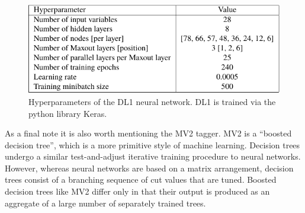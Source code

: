        
            \begin{figure}[tbh] \center
                \includegraphics[width=0.7\linewidth,height=\textheight,keepaspectratio]{tables/reconstruction/DL1_hyperparams}
                \caption{
                    Hyperparameters of the DL1 neural network\cite{bjet_id_and_performance}.
                    DL1 is trained via the python library Keras.
                }
                \label{tab:DL1_hyperparams}
            \end{figure}

            As a final note it is also worth mentioning the MV2 tagger.
            MV2 is a ``boosted decision tree'', which is a more primitive style of machine learning.
            Decision trees undergo a similar test-and-adjust iterative training procedure to neural networks.
            However, whereas neural networks are based on a matrix arrangement,
                decision trees consist of a branching sequence of cut values that are tuned.
            Boosted decision trees like MV2 differ only in that their output is produced as an aggregate of a large number of
                separately trained trees.


